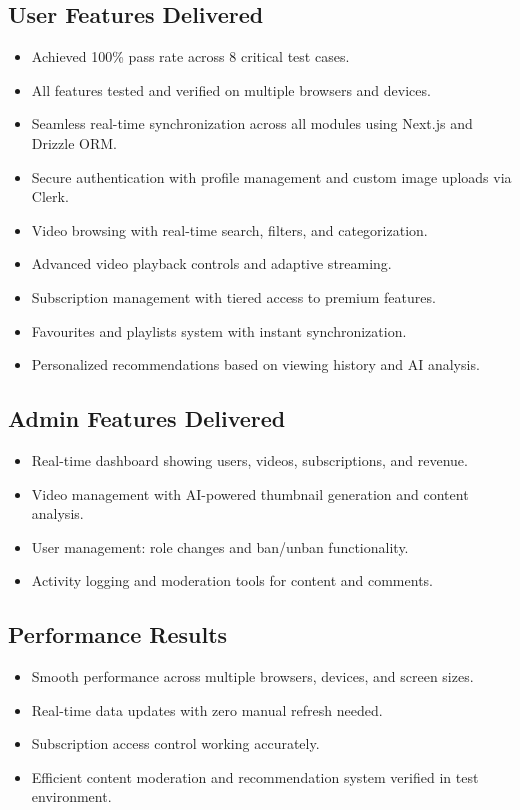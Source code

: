\subsection{User Features Delivered}

\begin{itemize}[leftmargin=2cm]
  \item Achieved 100\% pass rate across 8 critical test cases.
  \item All features tested and verified on multiple browsers and devices.
  \item Seamless real-time synchronization across all modules using Next.js and Drizzle ORM.
  \item Secure authentication with profile management and custom image uploads via Clerk.
  \item Video browsing with real-time search, filters, and categorization.
  \item Advanced video playback controls and adaptive streaming.
  \item Subscription management with tiered access to premium features.
  \item Favourites and playlists system with instant synchronization.
  \item Personalized recommendations based on viewing history and AI analysis.
\end{itemize}

\subsection{Admin Features Delivered}

\begin{itemize}[leftmargin=2cm]
  \item Real-time dashboard showing users, videos, subscriptions, and revenue.
  \item Video management with AI-powered thumbnail generation and content analysis.
  \item User management: role changes and ban/unban functionality.
  \item Activity logging and moderation tools for content and comments.
\end{itemize}

\subsection{Performance Results}

\begin{itemize}[leftmargin=2cm]
  \item Smooth performance across multiple browsers, devices, and screen sizes.
  \item Real-time data updates with zero manual refresh needed.
  \item Subscription access control working accurately.
  \item Efficient content moderation and recommendation system verified in test environment.
\end{itemize}

